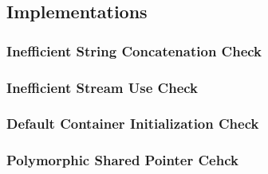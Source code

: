 \subsection{Implementations}
\subsubsection{Inefficient String Concatenation Check}
\subsubsection{Inefficient Stream Use Check}
\subsubsection{Default Container Initialization Check}
\subsubsection{Polymorphic Shared Pointer Cehck}
